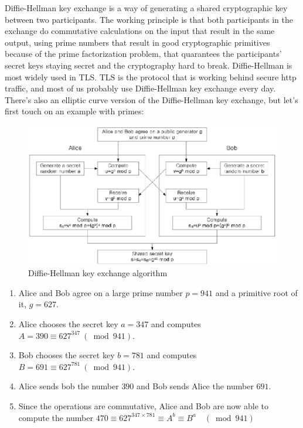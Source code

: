 Diffie-Hellman key exchange is a way of generating a shared cryptographic key between two participants. The working principle is that both participants in the exchange do commutative calculations on the input that result in the same output, using prime numbers that result in good cryptographic primitives because of the prime factorization problem, that quarantees the participants' secret keys staying secret and the cryptography hard to break. Diffie-Hellman is most widely used in TLS. TLS is the protocol that is working behind secure http traffic, and most of us probably use Diffie-Hellman key exchange every day. There's also an elliptic curve version of the Diffie-Hellman key exchange, but let's first touch on an example with primes:

\begin{figure}
	\includegraphics[width=\textwidth]{pictures/diffiehellman.eps}
	\caption{Diffie-Hellman key exchange algorithm\cite{Jeon2014-ag}}
	\label{Diagram, Diffie-Hellman Key Exchange}
\end{figure}

\begin{enumerate}
  \item Alice and Bob agree on a large prime number $p = 941$ and a primitive root of it, $g = 627$.
  \item Alice chooses the secret key $a = 347$ and computes
    \(A = 390 \equiv 627^{347} \ (\bmod 941).\)
  \item Bob chooses the secret key $b = 781$ and computes
    \(B = 691 \equiv 627^{781} \ (\bmod 941).\)
  \item Alice sends bob the number $390$ and Bob sends Alice the number $691$.
  \item Since the operations are commutative, Alice and Bob are now able to compute the number
    \(470 \equiv 627^{347 \times 781} \equiv A^b \equiv B^a \quad (\bmod 941)\)
\end{enumerate}

